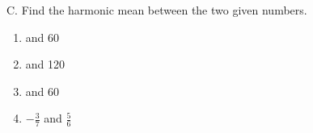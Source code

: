 C. Find the harmonic mean between the two given numbers. 
\begin{enumerate}[label = \arabic*. ]

\item {} and 60 
\vspce
\item {} and 120
\vspce
\item {} and 60
\vspce
\item \hspce $\displaystyle -\frac{3}{7}$ and $\displaystyle\frac{5}{6}$
\vspce


\end{enumerate}